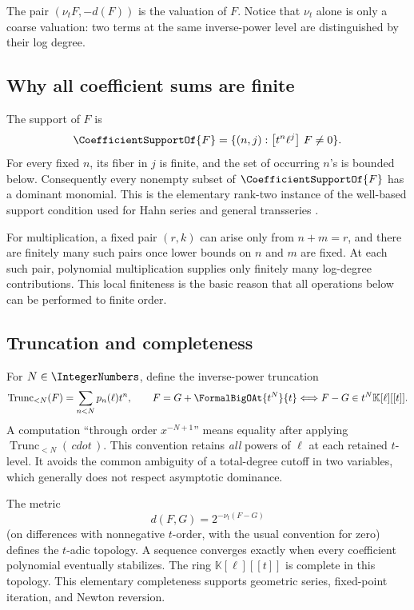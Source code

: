 \documentclass[11pt,oneside]{article}
\numberwithin{equation}{section}
\theoremstyle{definition}
\newcommand{\K}{\mathbb{K}}
\newcommand{\ordx}{\nu_t}
\newcommand{\TransseriesCoefficientOf}[2]{\left[#1\right]\,#2}
\newcommand{\TransseriesTruncateBelow}[2]{%
  \operatorname{Trunc}_{<#2}\!\left(#1\right)%
}
\begin{document}
The pair \((\ordx F,-d(F))\) is the valuation of \(F\).  Notice that
\(\ordx\) alone is only a coarse valuation: two terms at the same inverse-power
level are distinguished by their log degree.

\subsection{Why all coefficient sums are finite}

The support of \(F\) is
\[
  \CoefficientSupportOf{F}=\{(n,j):\TransseriesCoefficientOf{t^n\ell^j}{F}\ne0\}.
\]
For every fixed \(n\), its fiber in \(j\) is finite, and the set of occurring
\(n\)'s is bounded below.  Consequently every nonempty subset of \(\CoefficientSupportOf{F}\)
has a dominant monomial.  This is the elementary rank-two instance of the
well-based support condition used for Hahn series and general transseries
\cite{EdgarBeginners,Hahn1907}.

For multiplication, a fixed pair \((r,k)\) can arise only from
\(n+m=r\), and there are finitely many such pairs once lower bounds on \(n\) and
\(m\) are fixed.  At each such pair, polynomial multiplication supplies only
finitely many log-degree contributions.  This local finiteness is the basic
reason that all operations below can be performed to finite order.

\subsection{Truncation and completeness}

For \(N\in\IntegerNumbers\), define the inverse-power truncation
\begin{equation}\label{eq:truncation}
  \TransseriesTruncateBelow{F}{N}=\sum_{n<N}p_n(\ell)t^n,
  \qquad F=G+\FormalBigOAt{t^N}{t}
  \Longleftrightarrow F-G\in t^N\K[\ell][[t]].
\end{equation}
A computation ``through order \(x^{-N+1}\)'' means equality after applying
\(\TransseriesTruncateBelow{\,cdot\,}{N}\).
This convention retains \emph{all} powers of \(\ell\) at each retained
\(t\)-level.  It avoids the common ambiguity of a total-degree cutoff in two
variables, which generally does not respect asymptotic dominance.

The metric
\[
  d(F,G)=2^{-\ordx(F-G)}
\]
(on differences with nonnegative \(t\)-order, with the usual convention for
zero) defines the \(t\)-adic topology.  A sequence converges exactly when every
coefficient polynomial eventually stabilizes.  The ring
\(\K[\ell][[t]]\) is complete in this topology.  This elementary completeness
supports geometric series, fixed-point iteration, and Newton reversion.
\end{document}
